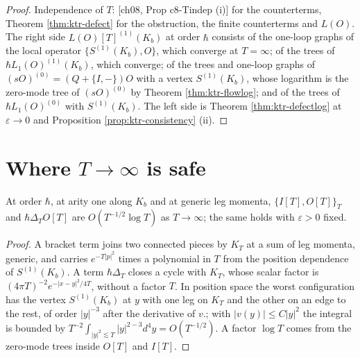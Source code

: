 \begin{proof}
Independence of $T$: [ch08, Prop c8-Tindep (i)] for the counterterms, Theorem \ref{thm:ktr-defect} for the obstruction, the finite counterterms and $L(O)$. The right side $L(O)[T]^{(1)}(K_b)$ at order $\hbar$ consists of the one-loop graphs of the local operator $\{S^{(1)}(K_b),O\}$, which converge at $T=\infty$; of the trees of $\hbar L_1(O)^{(1)}(K_b)$, which converge; of the trees and one-loop graphs of $(sO)^{(0)}=(Q+\{I,-\})O$ with a vertex $S^{(1)}(K_b)$, whose logarithm is the zero-mode tree of $(sO)^{(0)}$ by Theorem \ref{thm:ktr-flowlog}; and of the trees of $\hbar L_1(O)^{(0)}$ with $S^{(1)}(K_b)$. The left side is Theorem \ref{thm:ktr-defectlog} at $\varepsilon\to0$ and Proposition \ref{prop:ktr-consistency} (ii).
\end{proof}

\section{Where $T\to\infty$ is safe}

\begin{lemma}
\label{lem:ktr-KT}
At order $\hbar$, at arity one along $K_b$ and at generic leg momenta, $\{I[T],O[T]\}_T$ and $\hbar\Delta_TO[T]$ are $O(T^{-1/2}\log T)$ as $T\to\infty$; the same holds with $\varepsilon>0$ fixed.
\end{lemma}

\begin{proof}
A bracket term joins two connected pieces by $K_T$ at a sum of leg momenta, generic, and carries $e^{-T|p|^2}$ times a polynomial in $T$ from the position dependence of $S^{(1)}(K_b)$. A term $\hbar\Delta_T$ closes a cycle with $K_T$, whose scalar factor is $(4\pi T)^{-2}e^{-|x-y|^2/4T}$, without a factor $T$. In position space the worst configuration has the vertex $S^{(1)}(K_b)$ at $y$ with one leg on $K_T$ and the other on an edge to the rest, of order $|y|^{-3}$ after the derivative of $v.$; with $|v(y)|\le C|y|^2$ the integral is bounded by $T^{-2}\int_{|y|^2\lesssim T}|y|^{2-3}d^4y=O(T^{-1/2})$. A factor $\log T$ comes from the zero-mode trees inside $O[T]$ and $I[T]$.
\end{proof}

